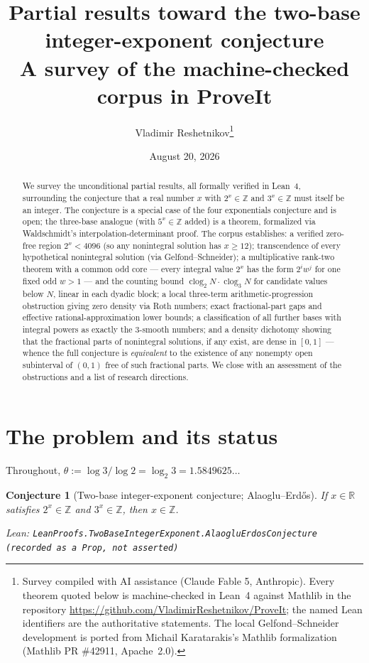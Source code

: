 \documentclass[11pt]{article}
\title{Partial results toward the two-base integer-exponent conjecture\\
{\large A survey of the machine-checked corpus in \textsf{ProveIt}}}
\author{Vladimir Reshetnikov\thanks{Survey compiled with AI assistance (Claude Fable 5,
Anthropic). Every theorem quoted below is machine-checked in Lean~4 against Mathlib in the
repository \url{https://github.com/VladimirReshetnikov/ProveIt}; the named Lean identifiers
are the authoritative statements. The local Gelfond--Schneider development is ported from
Michail Karatarakis's Mathlib formalization (Mathlib PR \#42911, Apache~2.0).}}
\date{August 20, 2026}
\newtheorem{conjecture}[theorem]{Conjecture}
\theoremstyle{definition}
\theoremstyle{remark}
\newcommand{\Z}{\mathbb{Z}}
\newcommand{\R}{\mathbb{R}}
\newcommand{\thetaq}{\theta}
\newcommand{\lean}[1]{\par\smallskip\noindent\begingroup\footnotesize\raggedright\emph{Lean:} \texttt{#1}\par\endgroup}
\newcommand{\clog}{\operatorname{clog}}
\begin{document}
\maketitle

\begin{abstract}
\noindent
We survey the unconditional partial results, all formally verified in Lean~4, surrounding the
conjecture that a real number $x$ with $2^x\in\Z$ and $3^x\in\Z$ must itself be an integer.
The conjecture is a special case of the four exponentials conjecture and is open; the
three-base analogue (with $5^x\in\Z$ added) is a theorem, formalized via Waldschmidt's
interpolation-determinant proof. The corpus establishes: a verified zero-free region
$2^x<4096$ (so any nonintegral solution has $x\ge 12$); transcendence of every hypothetical
nonintegral solution (via Gelfond--Schneider); a multiplicative rank-two theorem with a common
odd core --- every integral value $2^x$ has the form $2^i w^j$ for one fixed odd $w>1$ --- and the
counting bound $\clog_2 N\cdot\clog_3 N$ for candidate values below $N$, linear in each dyadic
block; a local three-term arithmetic-progression obstruction giving zero density via Roth
numbers; exact fractional-part gaps and effective rational-approximation lower bounds; a
classification of all further bases with integral powers as exactly the $3$-smooth numbers;
and a density dichotomy showing that the fractional parts of nonintegral solutions, if any
exist, are dense in $[0,1]$ --- whence the full conjecture is \emph{equivalent} to the existence
of any nonempty open subinterval of $(0,1)$ free of such fractional parts. We close with an
assessment of the obstructions and a list of research directions.
\end{abstract}

\tableofcontents

\section{The problem and its status}\label{sec:problem}

Throughout, $\thetaq := \log 3/\log 2 = \log_2 3 = 1.5849625\ldots$

\begin{conjecture}[Two-base integer-exponent conjecture; Alaoglu--Erd\H{o}s]\label{conj:main}
If $x\in\R$ satisfies $2^x\in\Z$ and $3^x\in\Z$, then $x\in\Z$.
\lean{LeanProofs.TwoBaseIntegerExponent.AlaogluErdosConjecture (recorded as a
\textnormal{\texttt{Prop}}, not asserted)}
\end{conjecture}
\end{document}
